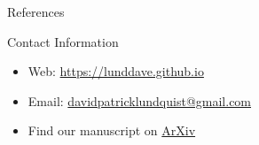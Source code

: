 \documentclass{beamer} %
\begin{document}
\begin{frame}[t]
\begin{columns}[t]
\begin{column}{0.465\textwidth}

\begin{block}{References}
	\vspace{-1ex} %
\end{block}




\begin{block}{Contact Information}
	\begin{itemize}
		\item Web: \href{https://lunddave.github.io}{https://lunddave.github.io}
		\item Email: \href{mailto:davidpatricklundquist@gmail.com}{davidpatricklundquist@gmail.com}
		\item Find our manuscript on \href{https://arxiv.org/abs/2406.08738}{ArXiv} \cite{lundquist2024volatility}
	\end{itemize}
\end{block}


\end{column} %

\begin{column}{0.02\textwidth}\end{column} %

\end{columns} %

\end{frame} %

\end{document}

